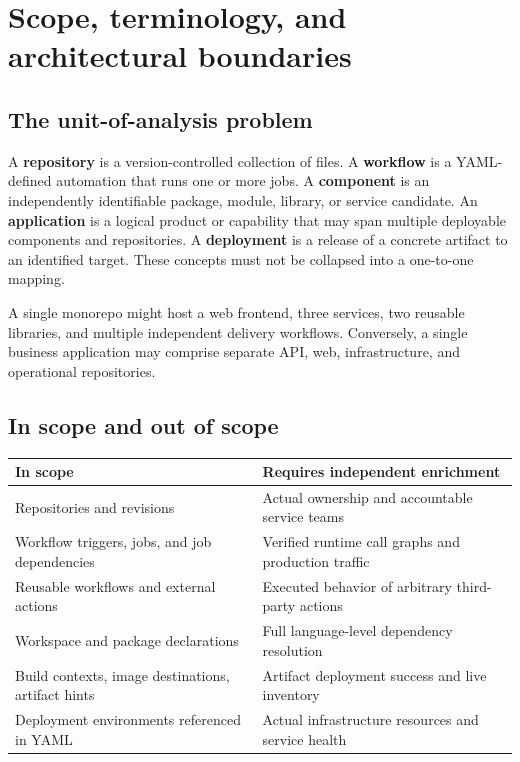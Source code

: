 \documentclass[11pt,letterpaper]{article}
\newcommand{\term}[1]{\textbf{\color{Navy}#1}}
\begin{document}
\vspace{3pt}
\tableofcontents

\section{Scope, terminology, and architectural boundaries}
\subsection{The unit-of-analysis problem}
A \term{repository} is a version-controlled collection of files. A \term{workflow} is a YAML-defined automation that runs one or more jobs. A \term{component} is an independently identifiable package, module, library, or service candidate. An \term{application} is a logical product or capability that may span multiple deployable components and repositories. A \term{deployment} is a release of a concrete artifact to an identified target. These concepts must not be collapsed into a one-to-one mapping.

A single monorepo might host a web frontend, three services, two reusable libraries, and multiple independent delivery workflows. Conversely, a single business application may comprise separate API, web, infrastructure, and operational repositories.

\subsection{In scope and out of scope}
\begin{tabularx}{\linewidth}{@{}P{1.55in}Y@{}}
\toprule
\textbf{In scope} & \textbf{Requires independent enrichment} \\
\midrule
Repositories and revisions & Actual ownership and accountable service teams \\
Workflow triggers, jobs, and job dependencies & Verified runtime call graphs and production traffic \\
Reusable workflows and external actions & Executed behavior of arbitrary third-party actions \\
Workspace and package declarations & Full language-level dependency resolution \\
Build contexts, image destinations, artifact hints & Artifact deployment success and live inventory \\
Deployment environments referenced in YAML & Actual infrastructure resources and service health \\
\bottomrule
\end{tabularx}
\end{document}
